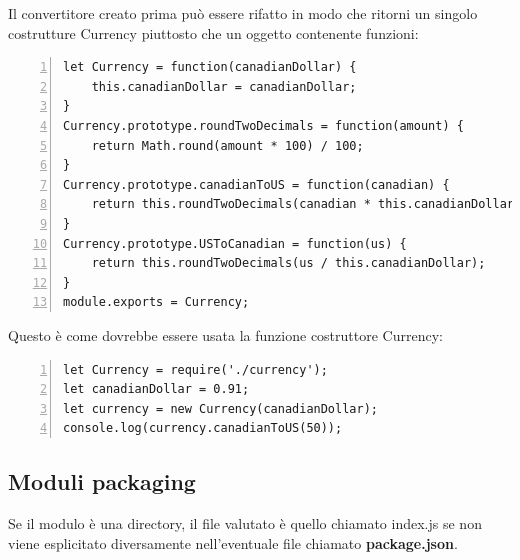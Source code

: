 Il convertitore creato prima può essere rifatto in modo che ritorni un singolo costrutture Currency piuttosto che un oggetto contenente funzioni:
\begin{Verbatim}[numbers = left, frame = single]
let Currency = function(canadianDollar) {
    this.canadianDollar = canadianDollar;
}
Currency.prototype.roundTwoDecimals = function(amount) {
    return Math.round(amount * 100) / 100;
}
Currency.prototype.canadianToUS = function(canadian) {
    return this.roundTwoDecimals(canadian * this.canadianDollar);
}
Currency.prototype.USToCanadian = function(us) {
    return this.roundTwoDecimals(us / this.canadianDollar);
}
module.exports = Currency;
\end{Verbatim}
Questo è come dovrebbe essere usata la funzione costruttore Currency:
\begin{Verbatim}[numbers = left, frame = single]
let Currency = require('./currency');
let canadianDollar = 0.91;
let currency = new Currency(canadianDollar);
console.log(currency.canadianToUS(50));
\end{Verbatim}

\subsection{Moduli packaging}
Se il modulo è una directory, il file valutato è quello chiamato index.js se non viene esplicitato diversamente nell'eventuale file chiamato \textbf{package.json}. 



